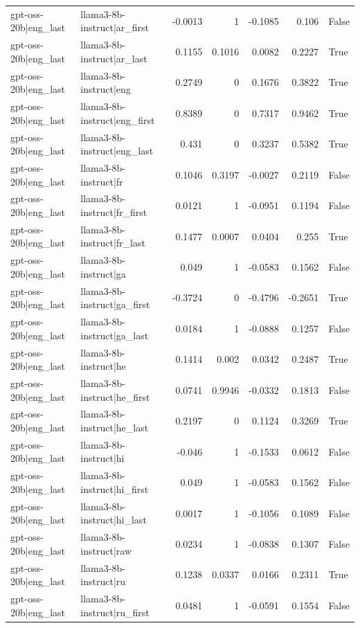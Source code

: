 \begin{table}
\begin{tabular}{l l r r r r l}
gpt-oss-20b|eng_last & llama3-8b-instruct|ar_first & -0.0013 & 1 & -0.1085 & 0.106 & False \\
gpt-oss-20b|eng_last & llama3-8b-instruct|ar_last & 0.1155 & 0.1016 & 0.0082 & 0.2227 & True \\
gpt-oss-20b|eng_last & llama3-8b-instruct|eng & 0.2749 & 0 & 0.1676 & 0.3822 & True \\
gpt-oss-20b|eng_last & llama3-8b-instruct|eng_first & 0.8389 & 0 & 0.7317 & 0.9462 & True \\
gpt-oss-20b|eng_last & llama3-8b-instruct|eng_last & 0.431 & 0 & 0.3237 & 0.5382 & True \\
gpt-oss-20b|eng_last & llama3-8b-instruct|fr & 0.1046 & 0.3197 & -0.0027 & 0.2119 & False \\
gpt-oss-20b|eng_last & llama3-8b-instruct|fr_first & 0.0121 & 1 & -0.0951 & 0.1194 & False \\
gpt-oss-20b|eng_last & llama3-8b-instruct|fr_last & 0.1477 & 0.0007 & 0.0404 & 0.255 & True \\
gpt-oss-20b|eng_last & llama3-8b-instruct|ga & 0.049 & 1 & -0.0583 & 0.1562 & False \\
gpt-oss-20b|eng_last & llama3-8b-instruct|ga_first & -0.3724 & 0 & -0.4796 & -0.2651 & True \\
gpt-oss-20b|eng_last & llama3-8b-instruct|ga_last & 0.0184 & 1 & -0.0888 & 0.1257 & False \\
gpt-oss-20b|eng_last & llama3-8b-instruct|he & 0.1414 & 0.002 & 0.0342 & 0.2487 & True \\
gpt-oss-20b|eng_last & llama3-8b-instruct|he_first & 0.0741 & 0.9946 & -0.0332 & 0.1813 & False \\
gpt-oss-20b|eng_last & llama3-8b-instruct|he_last & 0.2197 & 0 & 0.1124 & 0.3269 & True \\
gpt-oss-20b|eng_last & llama3-8b-instruct|hi & -0.046 & 1 & -0.1533 & 0.0612 & False \\
gpt-oss-20b|eng_last & llama3-8b-instruct|hi_first & 0.049 & 1 & -0.0583 & 0.1562 & False \\
gpt-oss-20b|eng_last & llama3-8b-instruct|hi_last & 0.0017 & 1 & -0.1056 & 0.1089 & False \\
gpt-oss-20b|eng_last & llama3-8b-instruct|raw & 0.0234 & 1 & -0.0838 & 0.1307 & False \\
gpt-oss-20b|eng_last & llama3-8b-instruct|ru & 0.1238 & 0.0337 & 0.0166 & 0.2311 & True \\
gpt-oss-20b|eng_last & llama3-8b-instruct|ru_first & 0.0481 & 1 & -0.0591 & 0.1554 & False \\

\end{tabular}
\end{table}
